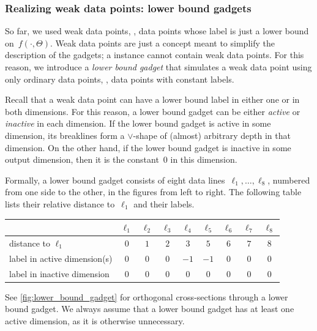 \documentclass{toc}
\begin{document}
\subsubsection{Realizing weak data points: lower bound gadgets}
\label{sec:lower_bound_gadget}

So far, we used weak data points, \ie, data points whose label is just a lower bound on~$f(\cdot, \Theta)$.
Weak data points are just a concept meant to simplify the description of the gadgets; a \trainNN instance cannot contain weak data points.
For this reason, we introduce a \emph{lower bound gadget} that simulates a weak data point using only ordinary data points, \ie, data points with constant labels.

Recall that a weak data point can have a lower bound label in either one or in both dimensions.
For this reason, a lower bound gadget can be either \emph{active} or \emph{inactive} in each dimension.
If the lower bound gadget is active in some dimension, its breaklines form a $\vee$-shape of (almost) arbitrary depth in that dimension.
On the other hand, if the lower bound gadget is inactive in some output dimension, then it is
%
the constant~$0$  %
in this dimension.

Formally, a lower bound gadget consists of eight data lines~$\ell_1, \ldots, \ell_8$, numbered from one side to the other, in the figures from left to right.
The following table lists their relative distance to~$\ell_1$ and their labels.

\begin{center}
    \begin{tabular}{lcccccccc}
        \toprule
        & $\ell_1$ & $\ell_2$ & $\ell_3$ & $\ell_4$ & $\ell_5$ & $\ell_6$ & $\ell_7$ & $\ell_8$ \\
        \midrule
        distance to $\ell_1$ & $0$ & $1$ & $2$ & $3$ & $5$ & $6$ & $7$ & $8$ \\
        label in active dimension(s) & $0$ & $0$ & $0$ & $-1$ & $-1$ & $0$ & $0$ & $0$ \\
        label in inactive dimension & $0$ & $0$ & $0$ & $0$ & $0$ & $0$ & $0$ & $0$ \\
        \bottomrule
    \end{tabular}
\end{center}
See \cref{fig:lower_bound_gadget} for orthogonal cross-sections through a lower bound gadget.
We always assume that a lower bound gadget has at least one active dimension, as it is otherwise unnecessary.
\end{document}
